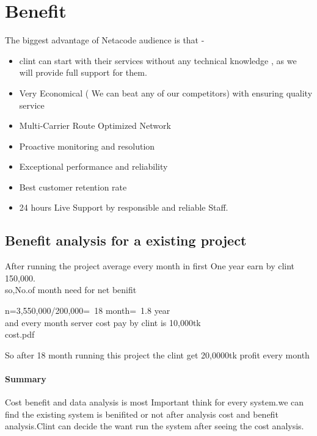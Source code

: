 \documentclass[a4paper,12pt]{report}
\begin{document}
	\section{Benefit}
	The biggest advantage of Netacode audience is that -
	\begin{itemize}
		\item	clint can start with their services without any technical
		knowledge , as we will provide full support for them.
		\item Very Economical ( We can beat any of our competitors) with ensuring quality service
		\item Multi-Carrier Route Optimized Network
		\item Proactive monitoring and resolution
		\item Exceptional performance and reliability
		\item Best customer retention rate
		\item 24 hours Live Support by responsible and reliable Staff.
	\end{itemize} 
\subsection{Benefit analysis for a existing project}
After running the project average every month in first One year  earn by clint 150,000.\\
so,No.of month  need for net benifit\begin{center}
	n=3,550,000/200,000=~18 month=~1.8 year \\
	and every month server cost pay  by clint is 10,000tk\\
	 {cost.pdf}
\end{center} 
So after 18 month running this project the clint get 20,0000tk profit every month
\paragraph{Summary}
Cost benefit and data analysis is most Important think for every system.we can find the existing system is benifited or not after analysis cost and benefit analysis.Clint can decide the want run the system after seeing the cost analysis.
	
	
\end{document}
